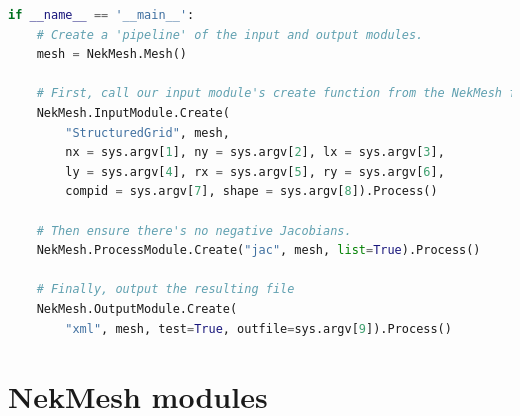 \begin{lstlisting}[style=C++Style, language=Python]
if __name__ == '__main__':
    # Create a 'pipeline' of the input and output modules.
    mesh = NekMesh.Mesh()

    # First, call our input module's create function from the NekMesh factory.
    NekMesh.InputModule.Create(
        "StructuredGrid", mesh,
        nx = sys.argv[1], ny = sys.argv[2], lx = sys.argv[3],
        ly = sys.argv[4], rx = sys.argv[5], ry = sys.argv[6],
        compid = sys.argv[7], shape = sys.argv[8]).Process()

    # Then ensure there's no negative Jacobians.
    NekMesh.ProcessModule.Create("jac", mesh, list=True).Process()

    # Finally, output the resulting file
    NekMesh.OutputModule.Create(
        "xml", mesh, test=True, outfile=sys.argv[9]).Process()
\end{lstlisting}


\section{NekMesh modules}

